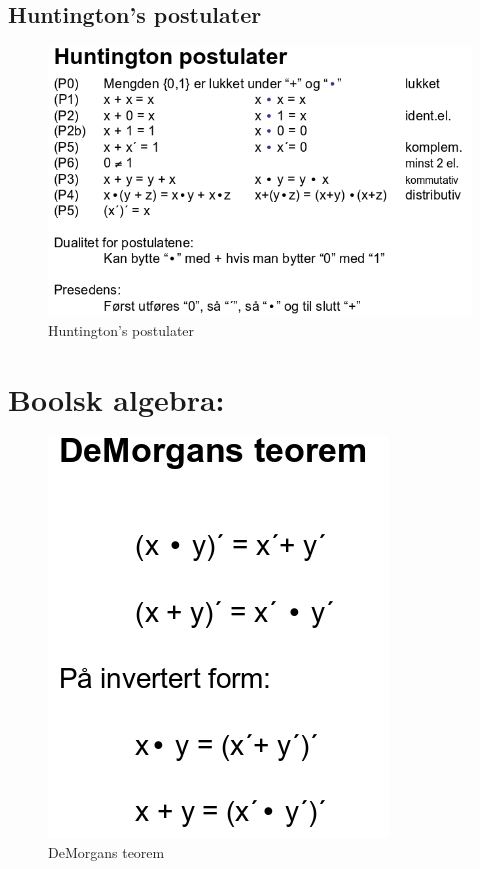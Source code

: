 \documentclass{article}
\begin{document}
	
	\subsection{Huntington's postulater}
	\begin{figure}[H]
		\includegraphics[scale=0.35]{Huntington.png}
		\caption{Huntington's postulater}
	\end{figure}
	
	
	\section{Boolsk algebra:}
	
	\begin{figure}[H]
		\includegraphics[scale=0.4]{DeMorgan.png}
		\caption{DeMorgans teorem}
	\end{figure}
	
\end{document}
